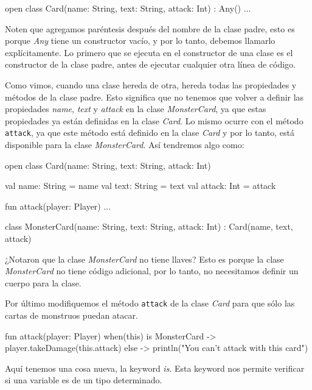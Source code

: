   \begin{kotlin}
    open class Card(name: String, text: String, attack: Int) : Any() {...}
  \end{kotlin}

  Noten que agregamos paréntesis después del nombre de la clase padre, esto es porque \textit{Any}
  tiene un constructor vacío, y por lo tanto, debemos llamarlo explícitamente.
  Lo primero que se ejecuta en el constructor de una clase es el constructor de la clase padre,
  antes de ejecutar cualquier otra línea de código.

  Como vimos, cuando una clase hereda de otra, hereda todas las propiedades y métodos de la clase
  padre.
  Esto significa que no tenemos que volver a definir las propiedades \textit{name}, \textit{text}
  y \textit{attack} en la clase \textit{MonsterCard}, ya que estas propiedades ya están definidas
  en la clase \textit{Card}.
  Lo mismo ocurre con el método \texttt{attack}, ya que este método está definido en la clase
  \textit{Card} y por lo tanto, está disponible para la clase \textit{MonsterCard}.
  Así tendremos algo como:

  \begin{kotlin}
    open class Card(name: String, text: String, attack: Int) {
      val name: String = name
      val text: String = text
      val attack: Int = attack

      fun attack(player: Player) {...}
    }
  \end{kotlin}

  \begin{kotlin}
    class MonsterCard(name: String, text: String, attack: Int) : Card(name, text, attack)
  \end{kotlin}

  ¿Notaron que la clase \textit{MonsterCard} no tiene llaves?
  Esto es porque la clase \textit{MonsterCard} no tiene código adicional, por lo tanto, no
  necesitamos definir un cuerpo para la clase.

  Por último modifiquemos el método \texttt{attack} de la clase \textit{Card} para que sólo las
  cartas de monstruos puedan atacar.

  \begin{kotlin}
    fun attack(player: Player) {
      when(this) {
        is MonsterCard -> player.takeDamage(this.attack)
        else -> println("You can't attack with this card")
      }
    }
  \end{kotlin}

  Aquí tenemos una cosa nueva, la keyword \textit{is}.
  Esta keyword nos permite verificar si una variable es de un tipo determinado.

